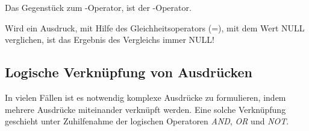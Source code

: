           Das Gegenst\"uck zum -Operator, ist der -Operator.
\clearpage
          \begin{merke}
            Wird ein Ausdruck, mit Hilfe des Gleichheitsoperators (=), mit dem Wert NULL verglichen, ist das Ergebnis des Vergleichs immer NULL!
          \end{merke}
      \subsection{Logische Verkn\"upfung von Ausdr\"ucken}
        In vielen F\"allen ist es notwendig komplexe Ausdr\"ucke zu formulieren, indem mehrere Ausdr\"ucke miteinander verkn\"upft werden. Eine solche Verkn\"upfung geschieht unter Zuhilfenahme der logischen Operatoren \textit{AND}, \textit{OR} und \textit{NOT}.
